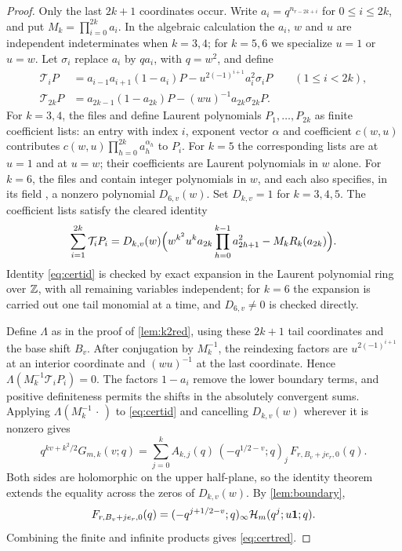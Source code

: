 \begin{proof}
Only the last $2k+1$ coordinates occur. Write $a_i=q^{n_{r-2k+i}}$ for $0\le i\le2k$, and put $M_k=\prod_{i=0}^{2k}a_i$. In the algebraic calculation the $a_i$, $w$ and $u$ are independent indeterminates when $k=3,4$; for $k=5,6$ we specialize $u=1$ or $u=w$. Let $\sigma_i$ replace $a_i$ by $qa_i$, with $q=w^2$, and define
\begin{align*}
\mathcal T_iP&=a_{i-1}a_{i+1}(1-a_i)P-u^{2(-1)^{i+1}}a_i^2\sigma_iP\qquad(1\le i<2k),\\
\mathcal T_{2k}P&=a_{2k-1}(1-a_{2k})P-(wu)^{-1}a_{2k}\sigma_{2k}P.
\end{align*}
For $k=3,4$, the files  and  define Laurent polynomials $P_1,\dots,P_{2k}$ as finite coefficient lists: an entry with index $i$, exponent vector $\alpha$ and coefficient $c(w,u)$ contributes $c(w,u)\prod_{h=0}^{2k}a_h^{\alpha_h}$ to $P_i$. For $k=5$ the corresponding lists are  at $u=1$ and  at $u=w$; their coefficients are Laurent polynomials in $w$ alone. For $k=6$, the files  and  contain integer polynomials in $w$, and each also specifies, in its field , a nonzero polynomial $D_{6,v}(w)$. Set $D_{k,v}=1$ for $k=3,4,5$. The coefficient lists satisfy the cleared identity
\begin{equation}\label{eq:certid}
\sum_{i=1}^{2k}\mathcal T_iP_i=D_{k,v}(w)\Bigl(w^{k^2}u^ka_{2k}\prod_{h=0}^{k-1}a_{2h+1}^2-M_kR_k(a_{2k})\Bigr).
\end{equation}
Identity \eqref{eq:certid} is checked by exact expansion in the Laurent polynomial ring over $\mathbb{Z}$, with all remaining variables independent; for $k=6$ the expansion is carried out one tail monomial at a time, and $D_{6,v}\ne0$ is checked directly.

Define $\Lambda$ as in the proof of \cref{lem:k2red}, using these $2k+1$ tail coordinates and the base shift $B_v$. After conjugation by $M_k^{-1}$, the reindexing factors are $u^{2(-1)^{i+1}}$ at an interior coordinate and $(wu)^{-1}$ at the last coordinate. Hence $\Lambda(M_k^{-1}\mathcal T_iP_i)=0$. The factors $1-a_i$ remove the lower boundary terms, and positive definiteness permits the shifts in the absolutely convergent sums. Applying $\Lambda(M_k^{-1}\,\cdot\,)$ to \eqref{eq:certid} and cancelling $D_{k,v}(w)$ wherever it is nonzero gives
\[
q^{kv+k^2/2}G_{m,k}(v;q)=\sum_{j=0}^kA_{k,j}(q)\,(-q^{1/2-v};q)_j\,F_{r,B_v+je_r,0}(q).
\]
Both sides are holomorphic on the upper half-plane, so the identity theorem extends the equality across the zeros of $D_{k,v}(w)$. By \cref{lem:boundary},
\[
F_{r,B_v+je_r,0}(q)=(-q^{j+1/2-v};q)_\infty\mathcal{H}_m(q^j;u\mathbf{1};q).
\]
Combining the finite and infinite products gives \eqref{eq:certred}.
\end{proof}

